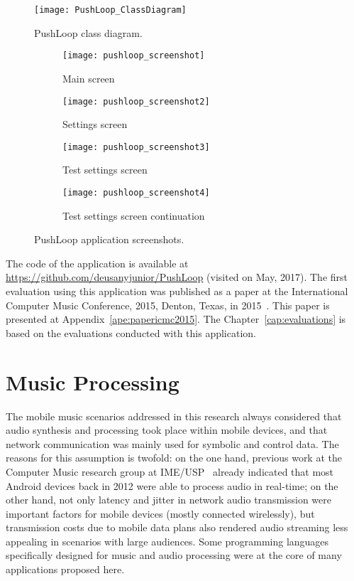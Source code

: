 \begin{figure}[!ht]
	\centering
	\texttt{[image: PushLoop\_ClassDiagram]}
	\caption{PushLoop class diagram.}
	\label{fig:pushloopclassdiagram}
\end{figure}

\begin{figure*}[!ht]
	\centering
	\begin{subfigure}{.20\textwidth}
		\texttt{[image: pushloop\_screenshot]}
		\caption{Main screen}
		\label{fig:pushloopss1}
	\end{subfigure}
	\begin{subfigure}{.20\textwidth}
		\texttt{[image: pushloop\_screenshot2]}
		\caption{Settings screen}
		\label{fig:pushloopss2}
	\end{subfigure}
	\begin{subfigure}{.20\textwidth}
		\texttt{[image: pushloop\_screenshot3]}
		\caption{Test settings screen}
		\label{fig:pushloopss3}
	\end{subfigure}
	\begin{subfigure}{.20\textwidth}
		\texttt{[image: pushloop\_screenshot4]}
		\caption{Test settings screen continuation}
		\label{fig:pushloopss4}
	\end{subfigure}
	
	\caption{PushLoop application screenshots.}
	\label{fig:pushloopscreenshots}
\end{figure*}

The code of the application is available at \url{https://github.com/deusanyjunior/PushLoop} (visited on May, 2017). 
The first evaluation using this application was published as a paper at the International Computer Music Conference, 2015, Denton, Texas, in 2015~\citep{deCarvalhoJunior2015computer}.
This paper is presented at Appendix~\ref{ape:papericmc2015}.
The Chapter~\ref{cap:evaluations} is based on the evaluations conducted with this application.



\section{Music Processing}

The mobile music scenarios addressed in this research always considered that audio synthesis and processing took place within mobile devices, and that network communication was mainly used for symbolic and control data. The reasons for this assumption is twofold: on the one hand, previous work at the Computer Music research group at IME/USP~\citep{bianchi2014processamento} already indicated that most Android devices back in 2012 were able to process audio in real-time; on the other hand, not only latency and jitter in network audio transmission were important factors for mobile devices (mostly connected wirelessly), but transmission costs due to mobile data plans also rendered audio streaming less appealing in scenarios with large audiences. Some programming languages specifically designed for music and audio processing were at the core of many applications proposed here.

